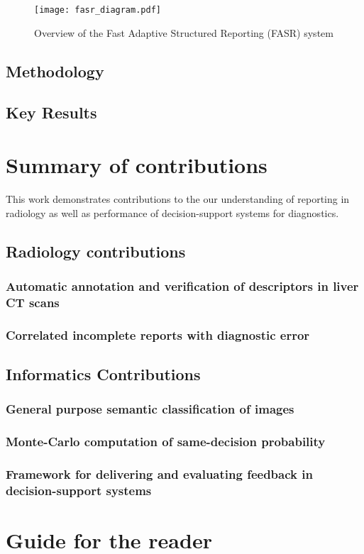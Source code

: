 \begin{figure}[h]
	\centering
	\texttt{[image: fasr\_diagram.pdf]}
	\caption{Overview of the Fast Adaptive Structured Reporting (FASR) system}
	\label{fig:fasr_diagram}
\end{figure}

\subsection{Methodology}

\subsection{Key Results}


\section{Summary of contributions}
This work demonstrates contributions to the our understanding of reporting in radiology as well as performance of decision-support systems for diagnostics.

\subsection{Radiology contributions}
\subsubsection{Automatic annotation and verification of descriptors in liver CT scans}
\subsubsection{Correlated incomplete reports with diagnostic error}

\subsection{Informatics Contributions}
\subsubsection{General purpose semantic classification of images}
\subsubsection{Monte-Carlo computation of same-decision probability}
\subsubsection{Framework for delivering and evaluating feedback in decision-support systems}


\section{Guide for the reader}

